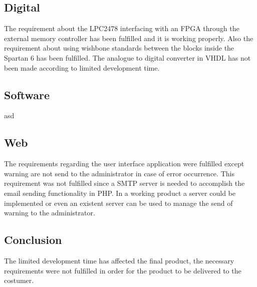 \subsection{Digital}
The requirement about the LPC2478 interfacing with an FPGA through the external memory controller has been fulfilled and it is working properly. Also the requirement about using wishbone standards between the blocks inside the Spartan 6 has been fulfilled. The analogue to digital converter in VHDL has not been made according to limited development time.
\subsection{Software}
asd
\subsection{Web}
The requirements regarding the user interface application were fulfilled except warning are not send to the administrator in case of error occurrence. This requirement was not fulfilled since a SMTP server is needed to accomplish the email sending functionality in PHP. In a working product a server could be implemented or even an existent server can be used to manage the send of warning to the administrator.
\subsection{Conclusion}
The limited development time has affected the final product, the necessary requirements were not fulfilled in order for the product to be delivered to the costumer.